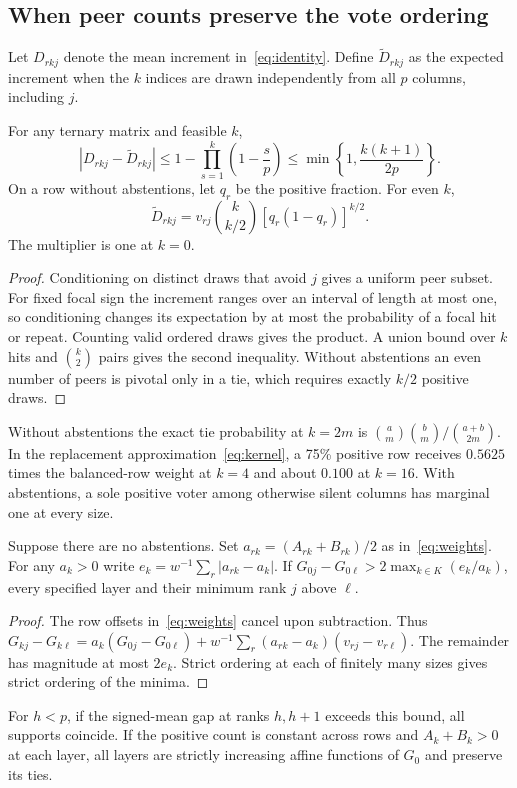 \subsection{When peer counts preserve the vote ordering}
Let $D_{rkj}$ denote the mean increment in~\eqref{eq:identity}. Define $\widetilde D_{rkj}$ as the expected increment when the $k$ indices are drawn independently from all $p$ columns, including $j$.

\begin{theorem}\label{thm:agreement}
For any ternary matrix and feasible $k$,
\begin{equation}
 |D_{rkj}-\widetilde D_{rkj}|
 \le 1-\prod_{s=1}^{k}\left(1-\frac{s}{p}\right)
 \le \min\left\{1,\frac{k(k+1)}{2p}\right\}.\label{eq:coupling}
\end{equation}
On a row without abstentions, let $q_r$ be the positive fraction. For even $k$,
\begin{equation}
 \widetilde D_{rkj}=v_{rj}\binom{k}{k/2}[q_r(1-q_r)]^{k/2}.\label{eq:kernel}
\end{equation}
The multiplier is one at $k=0$.
\end{theorem}
\begin{proof}
Conditioning on distinct draws that avoid $j$ gives a uniform peer subset. For fixed focal sign the increment ranges over an interval of length at most one, so conditioning changes its expectation by at most the probability of a focal hit or repeat. Counting valid ordered draws gives the product. A union bound over $k$ hits and $\binom{k}{2}$ pairs gives the second inequality. Without abstentions an even number of peers is pivotal only in a tie, which requires exactly $k/2$ positive draws.
\end{proof}
Without abstentions the exact tie probability at $k=2m$ is $\binom{a}{m}\binom{b}{m}/\binom{a+b}{2m}$. In the replacement approximation~\eqref{eq:kernel}, a 75\% positive row receives $0.5625$ times the balanced-row weight at $k=4$ and about $0.100$ at $k=16$. With abstentions, a sole positive voter among otherwise silent columns has marginal one at every size.

\begin{proposition}\label{prop:commonorder}
Suppose there are no abstentions. Set $a_{rk}=(A_{rk}+B_{rk})/2$ as in~\eqref{eq:weights}. For any $a_k>0$ write $e_k=w^{-1}\sum_r |a_{rk}-a_k|$. If
$G_{0j}-G_{0\ell}>2\max_{k\in K}(e_k/a_k)$, every specified layer and their minimum rank $j$ above $\ell$.
\end{proposition}
\begin{proof}
The row offsets in~\eqref{eq:weights} cancel upon subtraction. Thus
$G_{kj}-G_{k\ell}=a_k(G_{0j}-G_{0\ell})+
 w^{-1}\sum_r(a_{rk}-a_k)(v_{rj}-v_{r\ell})$.
The remainder has magnitude at most $2e_k$. Strict ordering at each of finitely many sizes gives strict ordering of the minima.
\end{proof}
For $h<p$, if the signed-mean gap at ranks $h,h+1$ exceeds this bound, all supports coincide. If the positive count is constant across rows and $A_k+B_k>0$ at each layer, all layers are strictly increasing affine functions of $G_0$ and preserve its ties.

